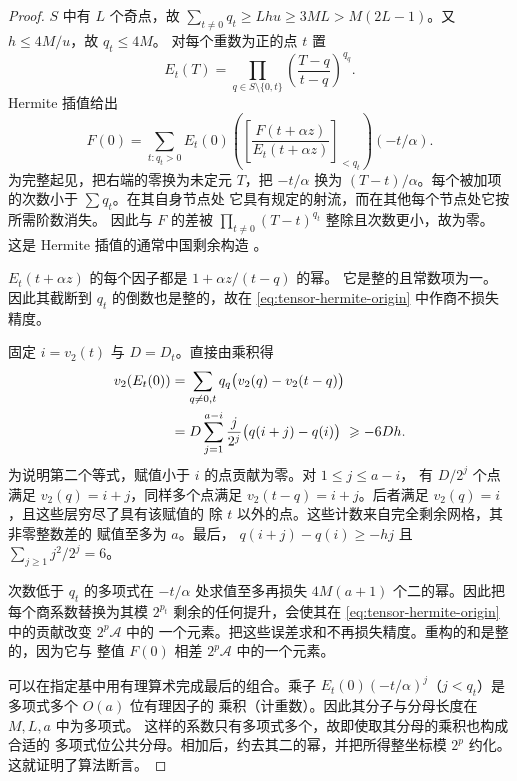 \begin{proof}
$S$ 中有 $L$ 个奇点，故
$\sum_{t\ne0}q_t\ge Lhu\ge3ML>M(2L-1)$。又
$h\le4M/u$，故 $q_t\le4M$。
对每个重数为正的点 $t$ 置
\[
 E_t(T)=\prod_{q\in S\setminus\{0,t\}}
                   \left(\frac{T-q}{t-q}\right)^{q_q}.
\]
Hermite 插值给出
\begin{equation}\label{eq:tensor-hermite-origin}
 F(0)=\sum_{t:q_t>0}E_t(0)
       \left(\left[\frac{F(t+\alpha z)}
                            {E_t(t+\alpha z)}\right]_{<q_t}\right)
                            (-t/\alpha).
\end{equation}
为完整起见，把右端的零换为未定元 $T$，把 $-t/\alpha$ 换为
$(T-t)/\alpha$。每个被加项的次数小于 $\sum q_t$。在其自身节点处
它具有规定的射流，而在其他每个节点处它按所需阶数消失。
因此与 $F$ 的差被
$\prod_{t\ne0}(T-t)^{q_t}$ 整除且次数更小，故为零。
这是 Hermite 插值的通常中国剩余构造 \cite[第~5.6~节]{vzGG13}。

$E_t(t+\alpha z)$ 的每个因子都是 $1+\alpha z/(t-q)$ 的幂。
它是整的且常数项为一。
因此其截断到 $q_t$ 的倒数也是整的，故在
\eqref{eq:tensor-hermite-origin} 中作商不损失精度。

固定 $i=v_2(t)$ 与 $D=D_t$。直接由乘积得
\begin{align}
 v_2(E_t(0))
 &=\sum_{q\ne0,t}q_q\bigl(v_2(q)-v_2(t-q)\bigr)\notag\\
 &=D\sum_{j=1}^{a-i}\frac{j}{2^j}
                          \bigl(q(i+j)-q(i)\bigr)
 \ \ge -6Dh. \label{eq:tensor-hermite-loss}
\end{align}
为说明第二个等式，赋值小于 $i$ 的点贡献为零。对 $1\le j\le a-i$，
有 $D/2^j$ 个点满足 $v_2(q)=i+j$，同样多个点满足
$v_2(t-q)=i+j$。后者满足 $v_2(q)=i$，且这些层穷尽了具有该赋值的
除 $t$ 以外的点。这些计数来自完全剩余网格，其非零整数差的
赋值至多为 $a$。最后，
$q(i+j)-q(i)\ge-hj$ 且 $\sum_{j\ge1}j^2/2^j=6$。

次数低于 $q_t$ 的多项式在 $-t/\alpha$ 处求值至多再损失
$4M(a+1)$ 个二的幂。因此把每个商系数替换为其模
$2^{p_t}$ 剩余的任何提升，会使其在
\eqref{eq:tensor-hermite-origin} 中的贡献改变 $2^p\mathcal A$ 中的
一个元素。把这些误差求和不再损失精度。重构的和是整的，因为它与
整值 $F(0)$ 相差 $2^p\mathcal A$ 中的一个元素。

可以在指定基中用有理算术完成最后的组合。乘子
$E_t(0)(-t/\alpha)^j$（$j<q_t$）是多项式多个 $O(a)$ 位有理因子的
乘积（计重数）。因此其分子与分母长度在 $M,L,a$ 中为多项式。
这样的系数只有多项式多个，故即使取其分母的乘积也构成合适的
多项式位公共分母。相加后，约去其二的幂，并把所得整坐标模 $2^p$
约化。这就证明了算法断言。
\end{proof}

